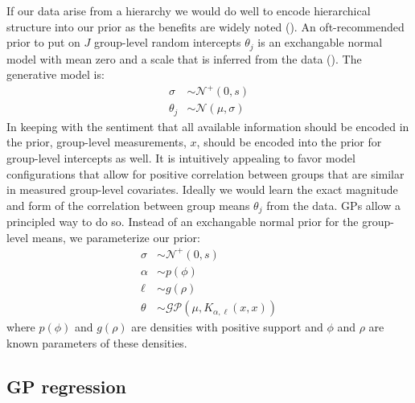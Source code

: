 \documentclass{article}
\begin{document}
If our data arise from a hierarchy we would do well to encode hierarchical
structure into our prior as the benefits are widely noted (\citet{}). An
oft-recommended prior to put on $J$ group-level random intercepts $\theta_j$ is an
exchangable normal model with mean zero and a scale that is inferred from the
data (\citet{gelman2014bayesian}). The generative model is: 
%
\begin{align*}
  \sigma & \sim \mathcal{N}^+(0, s) \\
  \theta_j & \sim \mathcal{N}(\mu, \sigma)
\end{align*}
%
In keeping with the sentiment that all available information should be encoded
in the prior, group-level measurements, $x$, should be encoded into the prior for
group-level intercepts as well. It is intuitively appealing to favor model
configurations that allow for positive correlation between groups that are
similar in measured group-level covariates. Ideally we would learn the exact
magnitude and form of the correlation between group means $\theta_j$ from the
data. GPs allow a principled way to do so. Instead of an exchangable normal
prior for the group-level means, we parameterize our prior:
%
\begin{align*}
  \sigma & \sim \mathcal{N}^+(0, s) \\
  \alpha & \sim p(\phi) \\
  \ell & \sim g(\rho) \\
  \theta & \sim \mathcal{GP}(\mu, K_{\alpha, \ell}(x, x))
\end{align*}
%
where $p(\phi)$ and $g(\rho)$ are densities with positive support and $\phi$ and
$\rho$ are known parameters of these densities.

\subsection{GP regression}
\end{document}
